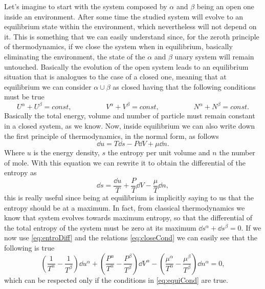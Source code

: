 {
    Let's imagine to start with the system composed by $\alpha$ and $\beta$ being an open one inside an environment. After some time the studied system will evolve to an equilibrium state within the environment, which nevertheless will not depend on it. This is something that we can easily understand since, for the zeroth principle of thermodynamics, if we close the system when in equilibrium, basically eliminating the environment, the state of the $\alpha$ and $\beta$ unary system will remain untouched. Basically the evolution of the open system leads to an equilibrium situation that is analogues to the case of a closed one, meaning that at equilibrium we can consider $\alpha \cup \beta$ as closed having that the following conditions must be true
    \begin{equation}
        \label{eq:closeCond}
        U^\alpha + U^\beta = const, \hspace{2cm} V^\alpha + V^\beta = const, \hspace{2cm} N^\alpha + N^\beta = const.
    \end{equation}
    Basically the total energy, volume and number of particle must remain constant in a closed system, as we know. Now, inside equilibrium we can also write down the first principle of thermodynamics, in the normal form, as follows
    \begin{equation}
        \dd u = T\dd s - P \dd V + \mu\dd n.
    \end{equation} 
    Where $u$ is the energy density, $s$ the entropy per unit volume and $n$ the number of mole. With this equation we can rewrite it to obtain the differential of the entropy as
    \begin{equation}
        \label{eq:entroDiff}
        \dd s = \frac{\dd u}{T} + \frac{P}{T}\dd V - \frac{\mu}{T} \dd n,
    \end{equation}
    this is really useful since being at equilibrium is implicitly saying to us that the entropy should be at a maximum. In fact, from classical thermodynamics we know that system evolves towards maximum entropy, so that the differential of the total entropy of the system must be zero at its maximum $\dd s^\alpha + \dd s^\beta = 0$. If we now use \eqref{eq:entroDiff} and the relations \eqref{eq:closeCond} we can easily see that the following is true
    \begin{equation}
        \left( \frac{1}{T^\alpha} - \frac{1}{T^\beta} \right)\dd u^\alpha + \left( \frac{P^\alpha}{T^\alpha} - \frac{P^\beta}{T^\beta} \right) \dd V^\alpha - \left( \frac{\mu^\alpha}{T^\alpha} - \frac{\mu^\beta}{T^\beta} \right) \dd n^\alpha = 0,
    \end{equation}
    which can be respected only if the conditions in \eqref{eq:equiCond} are true.
}

